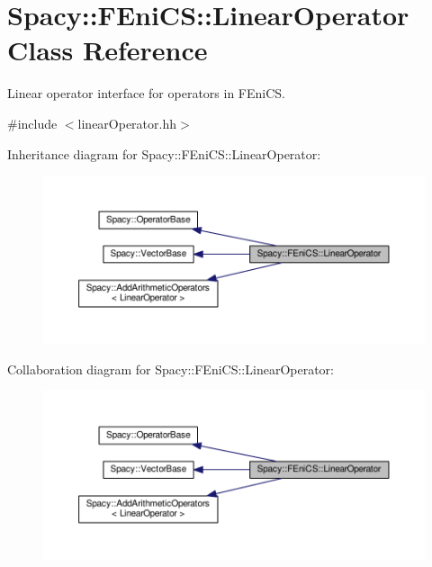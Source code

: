 \hypertarget{classSpacy_1_1FEniCS_1_1LinearOperator}{}\section{Spacy\+:\+:F\+Eni\+C\+S\+:\+:Linear\+Operator Class Reference}
\label{classSpacy_1_1FEniCS_1_1LinearOperator}


Linear operator interface for operators in F\+Eni\+C\+S.  




{\ttfamily \#include $<$linear\+Operator.\+hh$>$}



Inheritance diagram for Spacy\+:\+:F\+Eni\+C\+S\+:\+:Linear\+Operator\+:\nopagebreak
\begin{figure}[H]
\begin{center}
\leavevmode
\includegraphics[width=350pt]{classSpacy_1_1FEniCS_1_1LinearOperator__inherit__graph}
\end{center}
\end{figure}


Collaboration diagram for Spacy\+:\+:F\+Eni\+C\+S\+:\+:Linear\+Operator\+:\nopagebreak
\begin{figure}[H]
\begin{center}
\leavevmode
\includegraphics[width=350pt]{classSpacy_1_1FEniCS_1_1LinearOperator__coll__graph}
\end{center}
\end{figure}
